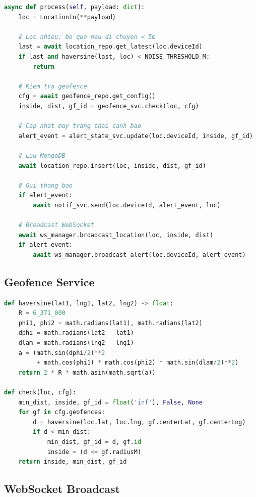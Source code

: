 \documentclass[13pt, a4paper]{report}
\begin{document}
\begin{lstlisting}[language=python, caption=location\_processor.py]
async def process(self, payload: dict):
    loc = LocationIn(**payload)

    # Loc nhieu: bo qua neu di chuyen < 5m
    last = await location_repo.get_latest(loc.deviceId)
    if last and haversine(last, loc) < NOISE_THRESHOLD_M:
        return

    # Kiem tra geofence
    cfg = await geofence_repo.get_config()
    inside, dist, gf_id = geofence_svc.check(loc, cfg)

    # Cap nhat may trang thai canh bao
    alert_event = alert_state_svc.update(loc.deviceId, inside, gf_id)

    # Luu MongoDB
    await location_repo.insert(loc, inside, dist, gf_id)

    # Gui thong bao
    if alert_event:
        await notif_svc.send(loc.deviceId, alert_event, loc)

    # Broadcast WebSocket
    await ws_manager.broadcast_location(loc, inside, dist)
    if alert_event:
        await ws_manager.broadcast_alert(loc.deviceId, alert_event)
\end{lstlisting}

\subsection{Geofence Service}

\begin{lstlisting}[language=python, caption=services/geofence\_service.py]
def haversine(lat1, lng1, lat2, lng2) -> float:
    R = 6_371_000
    phi1, phi2 = math.radians(lat1), math.radians(lat2)
    dphi = math.radians(lat2 - lat1)
    dlam = math.radians(lng2 - lng1)
    a = (math.sin(dphi/2)**2
         + math.cos(phi1) * math.cos(phi2) * math.sin(dlam/2)**2)
    return 2 * R * math.asin(math.sqrt(a))

def check(loc, cfg):
    min_dist, inside, gf_id = float('inf'), False, None
    for gf in cfg.geofences:
        d = haversine(loc.lat, loc.lng, gf.centerLat, gf.centerLng)
        if d < min_dist:
            min_dist, gf_id = d, gf.id
            inside = (d <= gf.radiusM)
    return inside, min_dist, gf_id
\end{lstlisting}

\subsection{WebSocket Broadcast}
\end{document}
